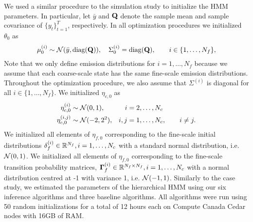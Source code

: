 We used a similar procedure to the simulation study to initialize the HMM parameters. In particular, let $\bar y$ and $\mathbf{Q}$ denote the sample mean and sample covariance of $\{y_t\}_{t=1}^T$, respectively. In all optimization procedures we initialized $\theta_0$ as
%
\begin{equation*}
    \mu^{(i)}_0 \sim \mathcal{N}(\bar y, \text{diag}(\mathbf{Q})), \quad \Sigma^{(i)}_0 = \text{diag}(\mathbf{Q}), \qquad i \in \{1,\ldots,N_f\},
\end{equation*}
%
Note that we only define emission distributions for $i = 1,\ldots,N_f$ because we assume that each coarse-scale state has the same fine-scale emission distributions.
Throughout the optimization procedure, we also assume that $\Sigma^{(i)}$ is diagonal for all $i \in \{1,\ldots,N_f\}$.
%
We initialized $\eta_{c,0}$ as
%
\begin{align*}
    \eta^{(i)}_{c,0} &\sim \mathcal{N}(0,1), & i & = 2,\ldots,N_c \\
    \eta^{(i,j)}_{c,0} &\sim \mathcal{N}(-2,2^2), & i,j & = 1,\ldots,N_c, \qquad i \neq j.
\end{align*}
%
We initialized all elements of $\eta_{f,0}$ corresponding to the fine-scale initial distributions $\delta^{(i)}_f \in \mathbb{R}^{N_f}, i = 1,\ldots,N_c$ with a standard normal distribution, i.e. $\mathcal{N}(0,1)$. We initialized all elements of $\eta_{f,0}$ corresponding to the fine-scale transition probability matrices, $\mathbf{\Gamma}^{(i)}_f \in {\mathbb{R}^{N_f \times N_f}}, i = 1,\ldots,N_c$ with a normal distribution centred at -1 with variance 1, i.e. $\mathcal{N}(-1,1)$.
%
%
Similarly to the case study, we estimated the parameters of the hierarchical HMM using our six inference algorithms and three baseline algorithms.
%
All algorithms were run using 50 random initializations for a total of 12 hours each on Compute Canada Cedar nodes with 16GB of RAM.

